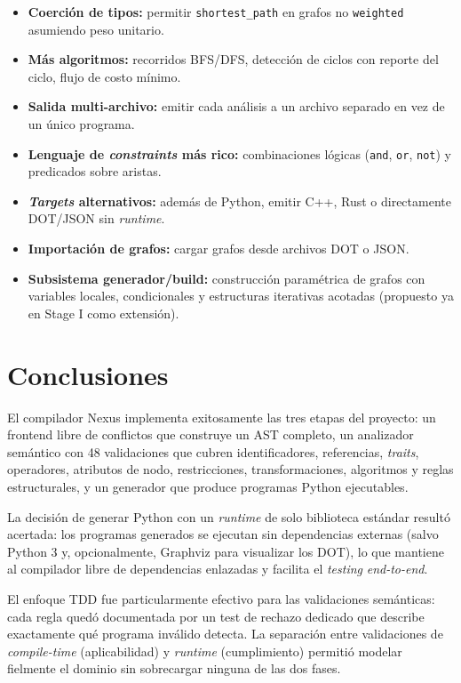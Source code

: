 \documentclass[11pt,a4paper]{article}
\newcommand{\code}[1]{\texttt{#1}}
\begin{document}
\begin{itemize}[noitemsep]
  \item \textbf{Coerción de tipos:} permitir \code{shortest\_path} en grafos no
        \code{weighted} asumiendo peso unitario.
  \item \textbf{Más algoritmos:} recorridos BFS/DFS, detección de ciclos con
        reporte del ciclo, flujo de costo mínimo.
  \item \textbf{Salida multi-archivo:} emitir cada análisis a un archivo
        separado en vez de un único programa.
  \item \textbf{Lenguaje de \emph{constraints} más rico:} combinaciones lógicas
        (\code{and}, \code{or}, \code{not}) y predicados sobre aristas.
  \item \textbf{\emph{Targets} alternativos:} además de Python, emitir C++,
        Rust o directamente DOT/JSON sin \emph{runtime}.
  \item \textbf{Importación de grafos:} cargar grafos desde archivos DOT o JSON.
  \item \textbf{Subsistema generador/build:} construcción paramétrica de grafos
        con variables locales, condicionales y estructuras iterativas acotadas
        (propuesto ya en Stage I como extensión).
\end{itemize}

\section{Conclusiones}

El compilador Nexus implementa exitosamente las tres etapas del proyecto: un
frontend libre de conflictos que construye un AST completo, un analizador
semántico con 48 validaciones que cubren identificadores, referencias,
\emph{traits}, operadores, atributos de nodo, restricciones, transformaciones,
algoritmos y reglas estructurales, y un generador que produce programas Python
ejecutables.

La decisión de generar Python con un \emph{runtime} de solo biblioteca estándar
resultó acertada: los programas generados se ejecutan sin dependencias externas
(salvo Python 3 y, opcionalmente, Graphviz para visualizar los DOT), lo que
mantiene al compilador libre de dependencias enlazadas y facilita el
\emph{testing} \emph{end-to-end}.

El enfoque TDD fue particularmente efectivo para las validaciones semánticas:
cada regla quedó documentada por un test de rechazo dedicado que describe
exactamente qué programa inválido detecta. La separación entre validaciones de
\emph{compile-time} (aplicabilidad) y \emph{runtime} (cumplimiento) permitió
modelar fielmente el dominio sin sobrecargar ninguna de las dos fases.
\end{document}
